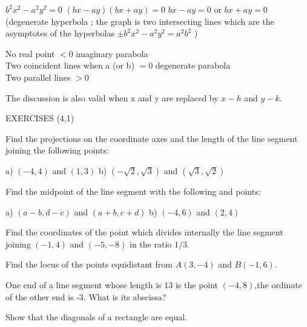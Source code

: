 \documentclass[11pt]{amsbook}
\begin{document}
	\begin{hItemize}{\arabic*}
		
	\item 
	$b^2 x^2 - a^2 y^2 =0 $  $(bx-ay)(bx+ay)=0  $ $ bx-ay=0 $ or $ bx+ay=0 $ 
	(degenerate hyperbola ; the graph is two
	intersecting lines which are the asymptotes of the hyperbolas
	$ \pm  b^2x^2 - a^2y^2= a^2b^2 $ )
	
	\item 
	No real point      
	\hspace{5.5cm}     
	$ <0 $  imaginary parabola     \\
	Two coincident lines \hspace{1cm} 
	when a (or b) \hspace{1cm} $ = 0 $ degenerate parabola \\
	Two parallel lines    
	\hspace{5cm}   $ >0  $ \\
	\end{hItemize}	
	
	The discussion is 
	also valid when
	x and y are replaced by
	$ x-h $ and $ y-k $. \\
	
	
		\begin{center} 
			 EXERCISES (4,1)
		 \end{center}

		
	
	\begin{hItemize}{\arabic*}  
	
	\item 
	Find the projections on the coordinate axes and the length of the line segment joining the following points:
	
	a) $ (-4,4)$  and $ (1,3)$  b) $ (-\sqrt{2},\sqrt{3})$  and $ (\sqrt{3},\sqrt{2})$
	
	\item 
	Find the midpoint of the line segment with the following and points:
	
	a) $ (a-b,d-c)$  and $ (a+b,c+d)$  b) $ (-4,6)$  and $ (2,4)$
	
	\item 
	Find the coordinates of the point which divides internally the line segment joining
	$ (-1,4) $ and $(-5,-8) $ in the ratio $ 1/3 $.
	
	\item 
	Find the locus of the points equidistant from $ A(3,-4) $ and $B(-1,6)$.
	
	\item 
	One end of a line segment whose length is 13 is the point $ (-4,8) $,the ordinate of 
	the other end is -3. What is its abscissa?

	\item 
	Show that the diagonals of a rectangle are equal.
	

    \end{hItemize}
	






\end{document}
